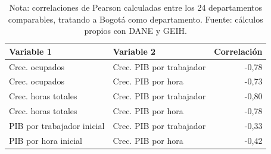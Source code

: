 \begin{table}[H]
\centering
\caption{Correlaciones departamentales seleccionadas sobre crecimiento y productividad}
\label{tab:pib_geih_productividad_departamento_correlaciones}
\begin{tabular}{llr}
\toprule
Variable 1 & Variable 2 & Correlación \\
\midrule
Crec. ocupados & Crec. PIB por trabajador & -0,78 \\
Crec. ocupados & Crec. PIB por hora & -0,73 \\
Crec. horas totales & Crec. PIB por trabajador & -0,80 \\
Crec. horas totales & Crec. PIB por hora & -0,78 \\
PIB por trabajador inicial & Crec. PIB por trabajador & -0,33 \\
PIB por hora inicial & Crec. PIB por hora & -0,42 \\
\bottomrule
\end{tabular}
\caption*{\footnotesize Nota: correlaciones de Pearson calculadas entre los 24 departamentos comparables, tratando a Bogotá como departamento. Fuente: cálculos propios con DANE y GEIH.}
\end{table}